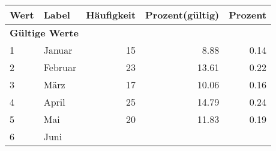      \begin{longtable}{lXrrr}
     \toprule
     \textbf{Wert} & \textbf{Label} & \textbf{Häufigkeit} & \textbf{Prozent(gültig)} & \textbf{Prozent} \\
     \endhead
     \midrule
     \multicolumn{5}{l}{\textbf{Gültige Werte}}\\

     1 &
     \multicolumn{1}{X}{ Januar   } &


       \num{15} &
       \num[round-mode=places,round-precision=2]{8,88} &
         \num[round-mode=places,round-precision=2]{0,14} \\

     2 &
     \multicolumn{1}{X}{ Februar   } &


       \num{23} &
       \num[round-mode=places,round-precision=2]{13,61} &
         \num[round-mode=places,round-precision=2]{0,22} \\

     3 &
     \multicolumn{1}{X}{ März   } &


       \num{17} &
       \num[round-mode=places,round-precision=2]{10,06} &
         \num[round-mode=places,round-precision=2]{0,16} \\

     4 &
     \multicolumn{1}{X}{ April   } &


       \num{25} &
       \num[round-mode=places,round-precision=2]{14,79} &
         \num[round-mode=places,round-precision=2]{0,24} \\

     5 &
     \multicolumn{1}{X}{ Mai   } &


       \num{20} &
       \num[round-mode=places,round-precision=2]{11,83} &
         \num[round-mode=places,round-precision=2]{0,19} \\

     6 &
     \multicolumn{1}{X}{ Juni   } &



\end{longtable}
